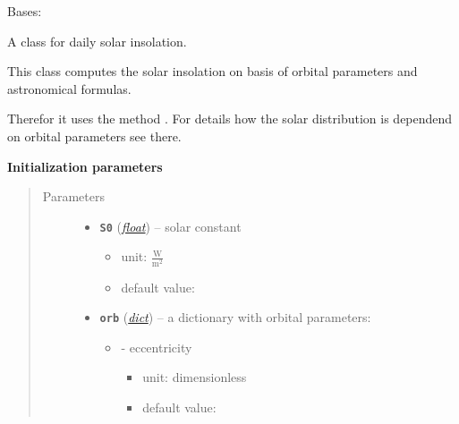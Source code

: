 \documentclass[letterpaper,10pt,english]{sphinxmanual}
\begin{document}

\begin{fulllineitems}
\label{api/climlab.radiation:climlab.radiation.insolation.DailyInsolation}
Bases: {\hyperref[api/climlab.radiation:climlab.radiation.insolation.AnnualMeanInsolation]{\emph{}}}

A class for daily solar insolation.

This class computes the solar insolation on basis of orbital parameters and 
astronomical formulas.

Therefor it uses the method {\hyperref[api/climlab.solar:climlab.solar.insolation.daily_insolation]{\emph{}}}.
For details how the solar distribution is dependend on orbital parameters 
see there.

\textbf{Initialization parameters}
\begin{quote}\begin{description}
\item[{Parameters}] \leavevmode\begin{itemize}
\item {} 
\textbf{\texttt{S0}} (\href{http://docs.python.org/2.7/library/functions.html\#float}{\emph{float}}) -- 
solar constant
\begin{itemize}
\item {} 
unit: \(\frac{\textrm{W}}{\textrm{m}^2}\)

\item {} 
default value: 

\end{itemize}


\item {} 
\textbf{\texttt{orb}} (\href{http://docs.python.org/2.7/library/stdtypes.html\#dict}{\emph{dict}}) -- 
a dictionary with orbital parameters:
\begin{itemize}
\item {} 
 - eccentricity
\begin{itemize}
\item {} 
unit: dimensionless

\item {} 
default value: 


\end{itemize}
\end{itemize}
\end{itemize}
\end{description}
\end{quote}
\end{fulllineitems}
\end{document}
